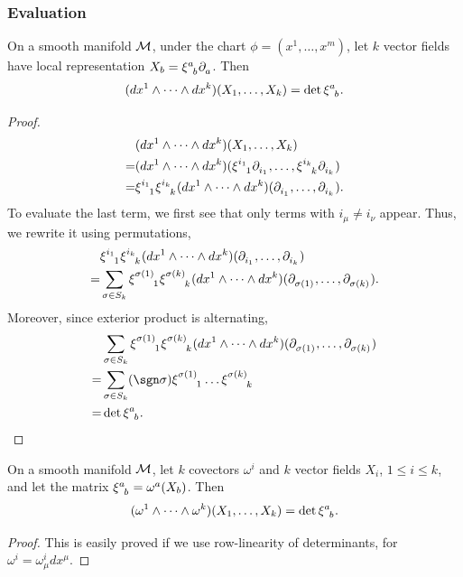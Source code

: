 \documentclass[../main.tex]{subfiles}
\begin{document}
    \subsubsection{Evaluation}
    \begin{theorem}\label{thm:evaluate-forms}
        On a smooth manifold \(\manifold[M]\), under the chart \(\phi = (x^1, 
        \dots, x^m)\), let \(k\) vector fields have local representation 
        \(X_b = \xi\indices{^a_b}\tfld{a}\). Then 
        \[
        (dx^1\wedge\dots\wedge dx^k)(X_1, \dots, X_k) = \det \xi\indices{^a_b}.
        \]
    \end{theorem}
    \begin{proof}
        \[
        \begin{aligned}
            &(dx^1\wedge\dots\wedge dx^k)(X_1, \dots, X_k)\\
            =&(dx^1\wedge\dots\wedge dx^k)(\xi\indices{^{i_1}_1}\tfld{i_1}, \dots, 
            \xi\indices{^{i_k}_k}\tfld{i_k})\\
            =&\xi\indices{^{i_1}_1}\xi\indices{^{i_k}_k}
            (dx^1\wedge\dots\wedge dx^k)(\tfld{i_1}, \dots, \tfld{i_k}).
        \end{aligned}
        \]
        To evaluate the last term, we first see that only terms with \(i_\mu \neq 
        i_\nu\) appear. Thus, we rewrite it using permutations, 
        \[
        \begin{aligned}
            &\xi\indices{^{i_1}_1}\xi\indices{^{i_k}_k}
            (dx^1\wedge\dots\wedge dx^k)(\tfld{i_1}, \dots, \tfld{i_k})\\
            =&\sum_{\sigma \in S_k} \xi\indices{^{\sigma(1)}_1}
            \xi\indices{^{\sigma(k)}_k}(dx^1\wedge\dots\wedge dx^k)
            (\tfld{\sigma(1)}, \dots, \tfld{\sigma(k)}).
        \end{aligned}
        \]
        Moreover, since exterior product is alternating, 
        \[
        \begin{aligned}
            &\sum_{\sigma \in S_k} \xi\indices{^{\sigma(1)}_1}
            \xi\indices{^{\sigma(k)}_k}(dx^1\wedge\dots\wedge dx^k)
            (\tfld{\sigma(1)}, \dots, \tfld{\sigma(k)})\\
            =&\sum_{\sigma \in S_k} (\sgn \sigma)\xi\indices{^{\sigma(1)}_1}\dots
            \xi\indices{^{\sigma(k)}_k}\\
            =&\det \xi\indices{^a_b}.
        \end{aligned}
        \]
    \end{proof}
    \begin{corollary}\label{cor:evaluate-forms}
        On a smooth manifold \(\manifold[M]\), let \(k\) covectors \(\omega^i\) and 
        \(k\) vector fields \(X_i\), \(1 \leq i \leq k\), and let the matrix 
        \(\xi\indices{^a_b}=\omega^a(X_b)\). Then
        \[
        (\omega^1\wedge\dots\wedge \omega^k)(X_1, \dots, X_k) = \det \xi\indices{^a_b}.
        \]
    \end{corollary}
    \begin{proof}
        This is easily proved if we use row-linearity of determinants, for 
        \(\omega^i = \omega^i_\mu dx^\mu\).
    \end{proof}
    \newpage
\end{document}
